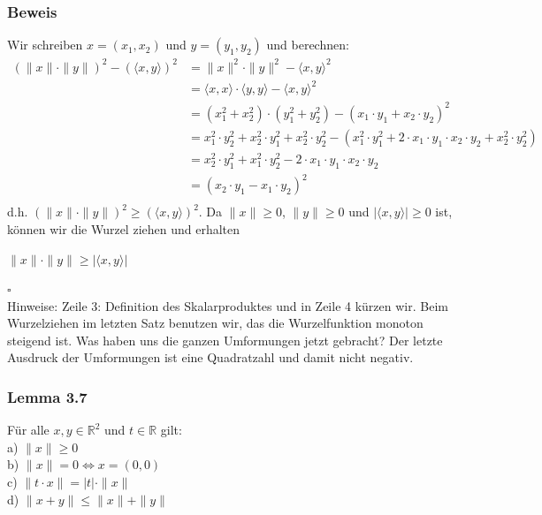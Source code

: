 \documentclass{article}
\begin{document}
\subsubsection*{Beweis}
Wir schreiben $x=(x_1, x_2)$ und $y=(y_1, y_2)$ und berechnen: \\
\begin{align*}
    (\|x\| \cdot \|y\|)^2 - (\langle x,y \rangle)^2 &= \|x\|^2 \cdot \|y\|^2 - \langle x,y \rangle^2 \\
    &= \langle x,x \rangle \cdot \langle y,y \rangle - \langle x,y \rangle^2 \\
    &= (x_1^2 + x_2^2) \cdot (y_1^2 + y_2^2) - (x_1 \cdot y_1 + x_2 \cdot y_2)^2 \\
    &= x_1^2 \cdot y_2^2 + x_2^2 \cdot y_1^2 + x_2^2 \cdot y_2^2 - (x_1^2 \cdot y_1^2 + 2 \cdot x_1 \cdot y_1 \cdot x_2 \cdot y_2 + x_2^2 \cdot y_2^2) \\
    &= x_2^2 \cdot y_1^2 + x_1^2 \cdot y_2^2 - 2 \cdot x_1 \cdot y_1 \cdot x_2 \cdot y_2 \\
    &= (x_2 \cdot y_1 - x_1 \cdot y_2)^2 \\
\end{align*}
d.h. $(\|x\| \cdot \|y\|)^2 \geq (\langle x,y \rangle)^2$. Da $\|x\| \geq 0$, $\|y\| \geq 0$ und $|\langle x,y \rangle| \geq 0$ ist, können wir die Wurzel ziehen und erhalten \\
\begin{center}
    $\|x\| \cdot \|y\| \geq |\langle x,y \rangle|$
\end{center}
$\square$ \\
Hinweise: Zeile 3: Definition des Skalarproduktes und in Zeile 4 kürzen wir. Beim Wurzelziehen im letzten Satz benutzen wir, das die Wurzelfunktion monoton steigend ist.
Was haben uns die ganzen Umformungen jetzt gebracht? Der letzte Ausdruck der Umformungen ist eine Quadratzahl und damit nicht negativ. \\

\subsubsection*{Lemma 3.7}
Für alle $x,y \in \mathbb{R}^2$ und $t \in \mathbb{R}$ gilt: \\
a) $\|x\| \geq 0$ \\
b) $\|x\| = 0 \Leftrightarrow x = (0,0)$ \\
c) $\|t \cdot x\| = |t| \cdot \|x\|$ \\
d) $\|x+y\| \leq \|x\| + \|y\|$ \\
\end{document}
